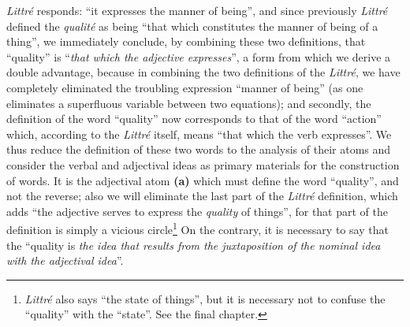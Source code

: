 \begin{sloppypar}
%
{\noindent
  \textsl{Littré} responds: ``it expresses the manner of being'', and
  since previously \textsl{Littré} defined the \emph{qualité} as being
  ``that which constitutes the manner of being of a thing'', we
  immediately conclude, by combining these two definitions, that
  ``quality'' is ``\emph{that which the adjective expresses}'', a form
  from which we derive a double advantage, because in combining the
  two definitions of the \textsl{Littré}, we have completely
  eliminated the troubling expression ``manner of being'' (as one
  eliminates a superfluous variable between two equations); and
  secondly, the definition of the word ``quality'' now corresponds to
  that of the word ``action'' which, according to the \textsl{Littré}
  itself, means ``that which the verb expresses''. We thus reduce the
  definition of these two words to the analysis of their atoms and
  consider the verbal and adjectival ideas as primary materials for
  the construction of words. It is the adjectival atom \textbf{(a)}
  which must define the word ``quality'', and not the reverse; also we
  will eliminate the last part of the \textsl{Littré} definition,
  which adds ``the adjective serves to express the \emph{quality} of
  things'', for that part of the definition is simply a vicious
  circle\footnote{\textsl{Littré} also says ``the state of things'',
    but it is necessary not to confuse the ``quality'' with the
    ``state''.  See the final chapter.} On the contrary, it is
  necessary to say that the ``quality is  \emph{the idea that
    results from the juxtaposition of the nominal idea with the
    adjectival idea}''.


}
\end{sloppypar}
